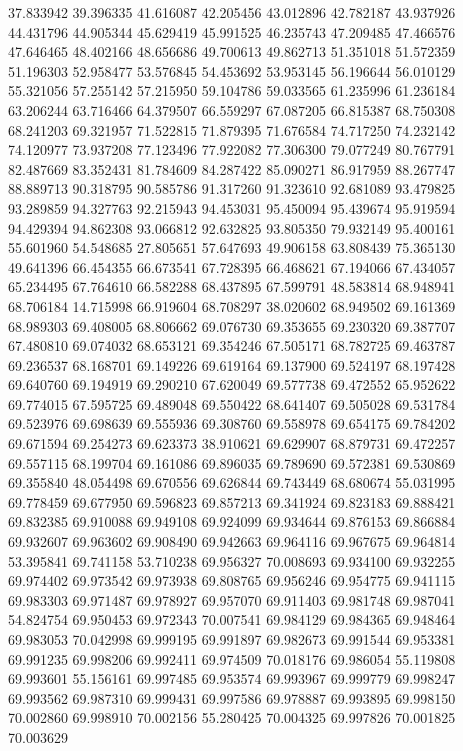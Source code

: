 37.833942
39.396335
41.616087
42.205456
43.012896
42.782187
43.937926
44.431796
44.905344
45.629419
45.991525
46.235743
47.209485
47.466576
47.646465
48.402166
48.656686
49.700613
49.862713
51.351018
51.572359
51.196303
52.958477
53.576845
54.453692
53.953145
56.196644
56.010129
55.321056
57.255142
57.215950
59.104786
59.033565
61.235996
61.236184
63.206244
63.716466
64.379507
66.559297
67.087205
66.815387
68.750308
68.241203
69.321957
71.522815
71.879395
71.676584
74.717250
74.232142
74.120977
73.937208
77.123496
77.922082
77.306300
79.077249
80.767791
82.487669
83.352431
81.784609
84.287422
85.090271
86.917959
88.267747
88.889713
90.318795
90.585786
91.317260
91.323610
92.681089
93.479825
93.289859
94.327763
92.215943
94.453031
95.450094
95.439674
95.919594
94.429394
94.862308
93.066812
92.632825
93.805350
79.932149
95.400161
55.601960
54.548685
27.805651
57.647693
49.906158
63.808439
75.365130
49.641396
66.454355
66.673541
67.728395
66.468621
67.194066
67.434057
65.234495
67.764610
66.582288
68.437895
67.599791
48.583814
68.948941
68.706184
14.715998
66.919604
68.708297
38.020602
68.949502
69.161369
68.989303
69.408005
68.806662
69.076730
69.353655
69.230320
69.387707
67.480810
69.074032
68.653121
69.354246
67.505171
68.782725
69.463787
69.236537
68.168701
69.149226
69.619164
69.137900
69.524197
68.197428
69.640760
69.194919
69.290210
67.620049
69.577738
69.472552
65.952622
69.774015
67.595725
69.489048
69.550422
68.641407
69.505028
69.531784
69.523976
69.698639
69.555936
69.308760
69.558978
69.654175
69.784202
69.671594
69.254273
69.623373
38.910621
69.629907
68.879731
69.472257
69.557115
68.199704
69.161086
69.896035
69.789690
69.572381
69.530869
69.355840
48.054498
69.670556
69.626844
69.743449
68.680674
55.031995
69.778459
69.677950
69.596823
69.857213
69.341924
69.823183
69.888421
69.832385
69.910088
69.949108
69.924099
69.934644
69.876153
69.866884
69.932607
69.963602
69.908490
69.942663
69.964116
69.967675
69.964814
53.395841
69.741158
53.710238
69.956327
70.008693
69.934100
69.932255
69.974402
69.973542
69.973938
69.808765
69.956246
69.954775
69.941115
69.983303
69.971487
69.978927
69.957070
69.911403
69.981748
69.987041
54.824754
69.950453
69.972343
70.007541
69.984129
69.984365
69.948464
69.983053
70.042998
69.999195
69.991897
69.982673
69.991544
69.953381
69.991235
69.998206
69.992411
69.974509
70.018176
69.986054
55.119808
69.993601
55.156161
69.997485
69.953574
69.993967
69.999779
69.998247
69.993562
69.987310
69.999431
69.997586
69.978887
69.993895
69.998150
70.002860
69.998910
70.002156
55.280425
70.004325
69.997826
70.001825
70.003629

